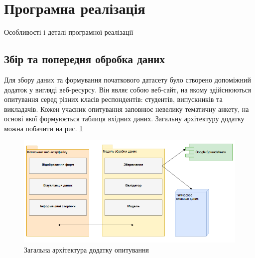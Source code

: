 \section{Програмна реалізація}
Особливості і деталі програмної реалізації

\subsection{Збір та попередня обробка даних}
Для збору даних та формування початкового датасету було створено допоміжний додаток у вигляді веб-ресурсу. Він являє собою веб-сайт, на якому здійснюються опитування серед різних класів респондентів: студентів, випускників та викладачів. Кожен учасник опитування заповнює невелику тематичну анкету, на основі якої формуюється таблиця вхідних даних. Загальну архітектуру додатку можна побачити на рис. \ref{fig:poll_architecture} 

\begin{figure}[h!]
  \includegraphics[width=\linewidth]{figures/poll_architecture.png}
  \caption{Загальна архітектура додатку опитування}
  \label{fig:poll_architecture}
\end{figure}

